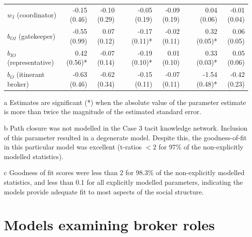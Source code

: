 \begin{table}
{\begin{threeparttable}
\begin{tabular}{@{}lrrlrrlrr@{}}
$w_I$ (coordinator) & -0.15 (0.46)\phantom{*} & -0.10 (0.29)\phantom{*} &  & -0.05 (0.19)\phantom{*} & -0.09 (0.19)\phantom{*} &  & 0.04 (0.06)\phantom{*} & -0.01 (0.04)\phantom{*} \\
$b_{OI}$ (gatekeeper) & -0.55 (0.99)\phantom{*} & 0.07 (0.12)\phantom{*} &  & -0.17 (0.11)* & -0.02 (0.11)\phantom{*} &  & 0.32 (0.05)* & 0.06 (0.05)\phantom{*} \\
$b_{IO}$ (representative) & 0.42 (0.56)* & -0.07 (0.14)\phantom{*} &  & -0.19 (0.10)* & 0.01 (0.10)\phantom{*} &  & 0.33 (0.03)* & 0.05 (0.06)\phantom{*} \\
$b_O$ (itinerant broker) & -0.63 (0.46)\phantom{*} & -0.62 (0.34)\phantom{*} &  & -0.15 (0.11)\phantom{*} & -0.07 (0.11)\phantom{*} &  & -1.54 (0.48)* & -0.42 (0.23)\phantom{*} \\
 \bottomrule
\end{tabular}
\begin{tablenotes}
\footnotesize
\item[a] Estimates are significant (*) when the absolute value of the parameter estimate is more than twice the magnitude of the estimated standard error.
\item[b] Path closure was not modelled in the Case 3 tacit knowledge network. Inclusion of this parameter resulted in a degenerate model. Despite this, the goodness-of-fit in this particular model was excellent (t-ratios $<2$ for 97\% of the non-explicitly modelled statistics).
\item[c] Goodness of fit scores were less than 2 for 98.3\% of the non-explicitly modelled statistics, and less than 0.1 for all explicitly modelled parameters, indicating the models provide adequate fit to most aspects of the social structure.

\end{tablenotes}

\end{threeparttable}
%
}
\end{table}

\section{Models examining broker roles}

